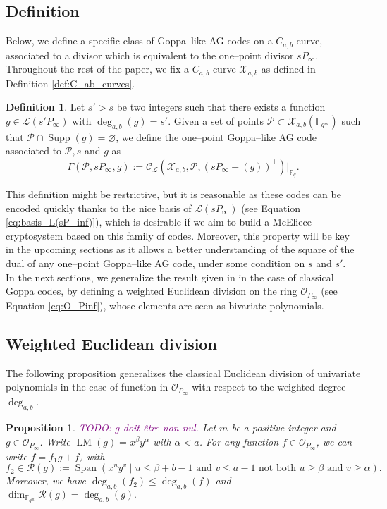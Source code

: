 \documentclass[a4paper]{amsart}
\newtheorem{proposition}[thm]{Proposition}
\theoremstyle{definition}
\newtheorem{definition}[thm]{Definition}
\theoremstyle{remark}
\newcommand{\calP}{\mathcal{P}}
\newcommand{\calL}{\mathcal{L}}
\newcommand{\calC}{\mathcal{C}}
\newcommand{\calO}{\mathcal{O}}
\newcommand{\calR}{\mathcal{R}}
\newcommand{\calX}{\mathcal{X}}
\newcommand{\fqm}{\mathbb{F}_{q^m}}
\newcommand{\fq}{\mathbb{F}_{q}}
\newcommand{\F}{\mathbb{F}}
\newcommand{\Span}[1]{\operatorname{Span}\left(#1\right)}
\newcommand{\LM}[1]{\operatorname{LM}\left(#1\right)}
\newcommand{\Supp}{\operatorname{Supp}}
\newcommand{\degab}[1]{\deg_{a,b}\left(#1\right)}
\newcommand\jade[1]{\textcolor{purple}{#1}}
\begin{document}
\subsection{Definition}

Below, we define a specific class of Goppa--like AG codes on a $C_{a,b}$ curve, associated to a divisor which is equivalent to the one--point divisor $sP_\infty$. 
\noindent Throughout the rest of the paper, we fix a $C_{a,b}$ curve $\calX_{a,b}$ as defined in Definition \ref{def:C_ab_curves}.
\begin{definition} \label{def:one--point_Goppa--like_AG_codes_on_C_a,b_curves}
Let $s'>s$ be two integers such that there exists a function $g \in \calL(s'P_\infty)$ with $\degab{g}=s'$. Given a set of points  $\calP \subset \calX_{a,b}(\F_{q^m})$ such that $\calP \cap \Supp(g) = \varnothing$, we define the one--point Goppa--like AG code associated to $\calP,s$ and $g$ as 
\[\Gamma(\calP,sP_\infty,g) := \calC_{\calL}(\calX_{a,b},\calP,(sP_\infty+(g))^{\perp})|_{\fq}.\]
\end{definition}
This definition might be restrictive, but it is reasonable as these codes can be encoded quickly thanks to the nice basis of $\calL(sP_\infty)$ (see Equation \eqref{eq:basis_L(sP_inf)}), which is desirable if we aim to build a McEliece cryptosystem based on this family of codes. Moreover, this property will be key in the upcoming sections as it allows a better understanding of the square of the dual of any one--point Goppa--like AG code, under some condition on $s$ and $s'$. \\

\noindent In the next sections, we generalize the result given in \cite{MT21} in the case of classical Goppa codes, by defining a weighted Euclidean division on the ring $\calO_{P_\infty}$ (see Equation \eqref{eq:O_Pinf}), whose elements are seen as bivariate polynomials. 
\subsection{Weighted Euclidean division}
\noindent The following proposition generalizes the classical Euclidean division of univariate polynomials in the case of function in $\calO_{P_\infty}$ with respect to the weighted degree $\deg_{a,b}$.

\begin{proposition}\label{prop:div_grob}
	\jade{TODO: $g$ doit être non nul.}
Let $m$ be a positive integer and $g \in \calO_{P_\infty}$. Write $\LM{g}=x^\beta y^\alpha$ with $\alpha < a$.
For any function $f \in \calO_{P_\infty}$, we can write $f=f_1g+f_2$ with 
\[f_2 \in \calR(g):= \Span{x^u y^v \mid u \leq \beta + b-1 \text{ and } v\leq a-1 \text{ not both }  u \geq \beta \text{ and } v \geq \alpha}.\]
Moreover, we have $\degab{f_2} \leq \degab{f}$ and $\dim_{\fqm} \calR(g) = \degab{g}.$ 
\end{proposition}
\end{document}
